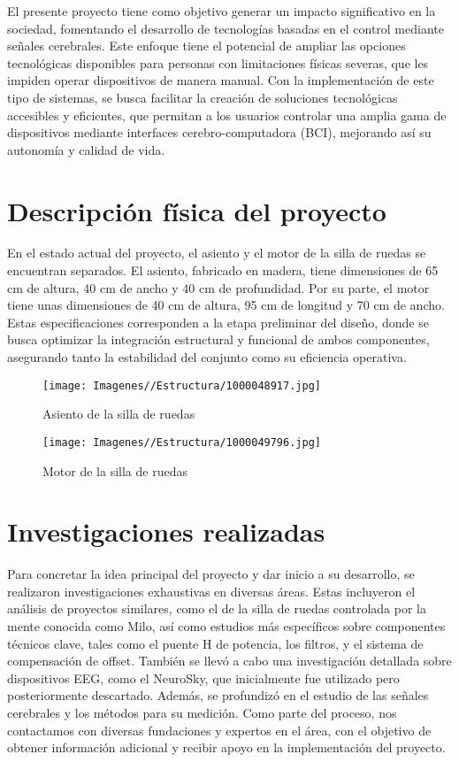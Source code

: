 \documentclass{article}
\begin{document}
El presente proyecto tiene como objetivo generar un impacto significativo en la sociedad, fomentando el desarrollo de tecnologías basadas en el control mediante señales cerebrales. Este enfoque tiene el potencial de ampliar las opciones tecnológicas disponibles para personas con limitaciones físicas severas, que les impiden operar dispositivos de manera manual. Con la implementación de este tipo de sistemas, se busca facilitar la creación de soluciones tecnológicas accesibles y eficientes, que permitan a los usuarios controlar una amplia gama de dispositivos mediante interfaces cerebro-computadora (BCI), mejorando así su autonomía y calidad de vida.

\section{Descripción física del proyecto}
En el estado actual del proyecto, el asiento y el motor de la silla de ruedas se encuentran separados. El asiento, fabricado en madera, tiene dimensiones de 65 cm de altura, 40 cm de ancho y 40 cm de profundidad. Por su parte, el motor tiene unas dimensiones de 40 cm de altura, 95 cm de longitud y 70 cm de ancho. Estas especificaciones corresponden a la etapa preliminar del diseño, donde se busca optimizar la integración estructural y funcional de ambos componentes, asegurando tanto la estabilidad del conjunto como su eficiencia operativa.

\begin{figure}[H]
    \centering
    \texttt{[image: Imagenes//Estructura/1000048917.jpg]}
    \caption{Asiento de la silla de ruedas}
\end{figure}

\begin{figure}[H]
    \centering
    \texttt{[image: Imagenes//Estructura/1000049796.jpg]}
    \caption{Motor de la silla de ruedas}
\end{figure}

\section{Investigaciones realizadas}

Para concretar la idea principal del proyecto y dar inicio a su desarrollo, se realizaron investigaciones exhaustivas en diversas áreas. Estas incluyeron el análisis de proyectos similares, como el de la silla de ruedas controlada por la mente conocida como Milo, así como estudios más específicos sobre componentes técnicos clave, tales como el puente H de potencia, los filtros, y el sistema de compensación de offset. También se llevó a cabo una investigación detallada sobre dispositivos EEG, como el NeuroSky, que inicialmente fue utilizado pero posteriormente descartado. Además, se profundizó en el estudio de las señales cerebrales y los métodos para su medición. Como parte del proceso, nos contactamos con diversas fundaciones y expertos en el área, con el objetivo de obtener información adicional y recibir apoyo en la implementación del proyecto.
\end{document}
